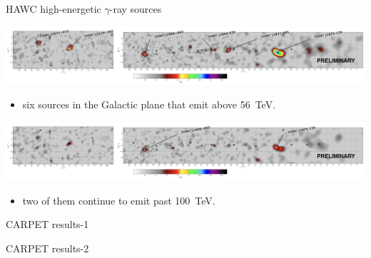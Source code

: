 \begin{frame}{HAWC high-energetic $\gamma$-ray sources}

\includegraphics[width=1\textwidth]{pics/Malone0.png}
\begin{itemize}
  \item six sources in the Galactic plane that emit above 56~TeV.
\end{itemize}
\includegraphics[width=1\textwidth]{pics/Malone1.png}
\begin{itemize}
  \item two of them continue to emit past 100~TeV.
\end{itemize}

\end{frame}

\begin{frame}{CARPET results-1}

\end{frame}

\begin{frame}{CARPET results-2}

\end{frame}
